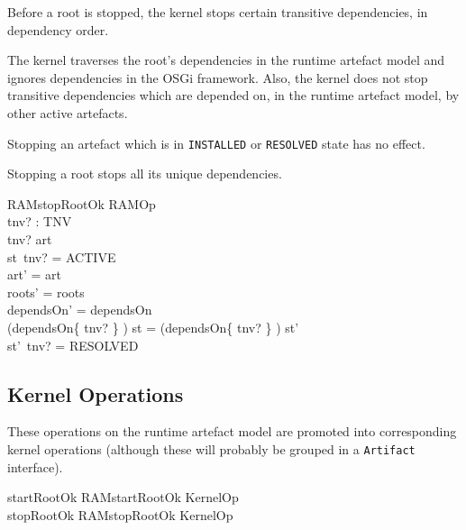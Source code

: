 \documentclass[a4paper,12pt]{article}
\begin{document}
Before a root is stopped, the kernel stops certain transitive dependencies, in dependency order.

The kernel traverses the root's dependencies in the runtime artefact model and ignores dependencies in the OSGi framework. Also, the kernel 
does not stop transitive dependencies which are depended on, in the runtime artefact model,
by other active artefacts.

Stopping an artefact which is in \texttt{INSTALLED} or \texttt{RESOLVED} state has no effect.

Stopping a root stops all its unique dependencies.
\begin{schema}{RAMstopRootOk}
RAMOp \\
tnv? : TNV \\
\where
tnv? \in \dom art \\
st~tnv? = ACTIVE \\
art' = art \\
roots' = roots \\
dependsOn' = dependsOn \\
(dependsOn\star \limg \{ tnv? \} \rimg) \ndres st = (dependsOn\star \limg \{ tnv? \} \rimg) \ndres st' \\
st'~tnv? = RESOLVED \\
\end{schema}

\subsection*{Kernel Operations}

These operations on the runtime artefact model are promoted into corresponding kernel operations
(although these will probably be grouped in a \texttt{Artifact} interface).
\begin{zed}
startRootOk  RAMstartRootOk \land KernelOp \\
\also
stopRootOk  RAMstopRootOk \land KernelOp \\
\end{zed}
\end{document}
